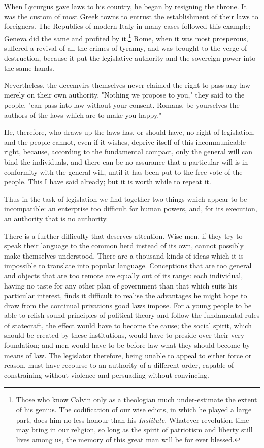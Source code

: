 \documentclass[12pt]{book}
\begin{document}
When Lycurgus gave laws to his country, he began by resigning the throne. It was the custom of most Greek towns to entrust the establishment of their laws to foreigners. The Republics of modern Italy in many cases followed this example; Geneva did the same and profited by it.\footnote{Those who know Calvin only as a theologian much under-estimate the extent of his genius. The codification of our wise edicts, in which he played a large part, does him no less honour than his \textit{Institute}. Whatever revolution time may bring in our religion, so long as the spirit of patriotism and liberty still lives among us, the memory of this great man will be for ever blessed.} Rome, when it was most prosperous, suffered a revival of all the crimes of tyranny, and was brought to the verge of destruction, because it put the legislative authority and the sovereign power into the same hands.

Nevertheless, the decemvirs themselves never claimed the right to pass any law merely on their own authority. "Nothing we propose to you," they said to the people, "can pass into law without your consent. Romans, be yourselves the authors of the laws which are to make you happy."

He, therefore, who draws up the laws has, or should have, no right of legislation, and the people cannot, even if it wishes, deprive itself of this incommunicable right, because, according to the fundamental compact, only the general will can bind the individuals, and there can be no assurance that a particular will is in conformity with the general will, until it has been put to the free vote of the people. This I have said already; but it is worth while to repeat it.

Thus in the task of legislation we find together two things which appear to be incompatible: an enterprise too difficult for human powers, and, for its execution, an authority that is no authority.

There is a further difficulty that deserves attention. Wise men, if they try to speak their language to the common herd instead of its own, cannot possibly make themselves understood. There are a thousand kinds of ideas which it is impossible to translate into popular language. Conceptions that are too general and objects that are too remote are equally out of its range: each individual, having no taste for any other plan of government than that which suits his particular interest, finds it difficult to realise the advantages he might hope to draw from the continual privations good laws impose. For a young people to be able to relish sound principles of political theory and follow the fundamental rules of statecraft, the effect would have to become the cause; the social spirit, which should be created by these institutions, would have to preside over their very foundation; and men would have to be before law what they should become by means of law. The legislator therefore, being unable to appeal to either force or reason, must have recourse to an authority of a different order, capable of constraining without violence and persuading without convincing.
\end{document}
